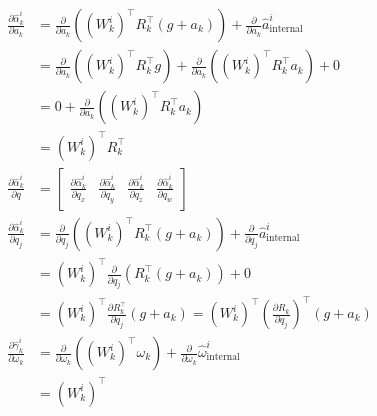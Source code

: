 \documentclass[11pt]{article}
\newcommand{\pd}[2]{\frac{\partial #1}{\partial #2}} %
\begin{document}
\begin{align*}
    \pd{\hat{\alpha}^i_k}{a_k} &= \pd{}{a_k} \left((W_k^i)^\top R_k^\top (g + a_k)\right) + \pd{}{a_k} \hat{a}^i_{\text{internal}} \\
    &= \pd{}{a_k} \left((W_k^i)^\top R_k^\top g\right) + \pd{}{a_k} \left((W_k^i)^\top R_k^\top a_k\right) + 0 \\ 
    &= 0 + \pd{}{a_k} \left((W_k^i)^\top R_k^\top a_k\right) \\
    &= (W_k^i)^\top R_k^\top \\
    \pd{\hat{\alpha}^i_k}{q} &= \begin{bmatrix}
        \pd{\hat{\alpha}^i_k}{q_x} & \pd{\hat{\alpha}^i_k}{q_y} & \pd{\hat{\alpha}^i_k}{q_z} & \pd{\hat{\alpha}^i_k}{q_w}
    \end{bmatrix} \\
    \pd{\hat{\alpha}^i_k}{q_j} &= \pd{}{q_j} \left((W_k^i)^\top R_k^\top (g + a_k)\right) + \pd{}{q_j} \hat{a}^i_{\text{internal}} \\
    &= (W_k^i)^\top \pd{}{q_j} \left( R_k^\top (g + a_k)\right) + 0 \\
    &= (W_k^i)^\top \pd{R_k^\top}{q_j} (g + a_k) = (W_k^i)^\top \left(\pd{R_k}{q_j}\right)^\top (g + a_k) \\
    \pd{\hat{\gamma}^i_k}{\omega_k} &= \pd{}{\omega_k} \left((W_k^i)^\top \omega_k\right) + \pd{}{\omega_k} \hat{\omega}^i_{\text{internal}} \\
    &= (W_k^i)^\top \\
\end{align*}
\end{document}
